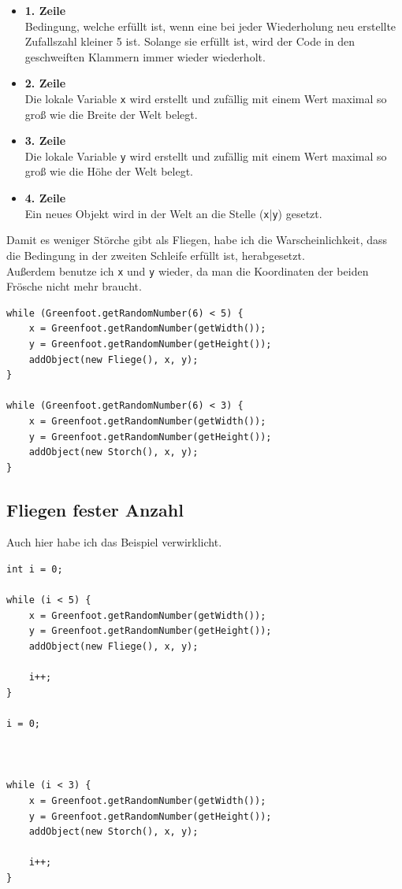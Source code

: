 \documentclass{scrartcl}   %
\begin{document}
\begin{itemize}
    \barrow
    \begin{itemize}
        \item \textbf{1. Zeile}\\
        Bedingung, welche erfüllt ist, wenn eine bei jeder Wiederholung neu erstellte Zufallszahl kleiner 5 ist. Solange sie erfüllt ist, wird der Code in den geschweiften Klammern immer wieder wiederholt.
        \item \textbf{2. Zeile}\\
        Die lokale Variable \texttt{x} wird erstellt und zufällig mit einem Wert maximal so groß wie die Breite der Welt belegt.
        \item \textbf{3. Zeile}\\
        Die lokale Variable \texttt{y} wird erstellt und zufällig mit einem Wert maximal so groß wie die Höhe der Welt belegt.
        \item \textbf{4. Zeile}\\
        Ein neues Objekt wird in der Welt an die Stelle (\texttt{x}|\texttt{y}) gesetzt.
    \end{itemize}
    \barrow Damit es weniger Störche gibt als Fliegen, habe ich die Warscheinlichkeit, dass die Bedingung in der zweiten Schleife erfüllt ist, herabgesetzt.\\
    Außerdem benutze ich \texttt{x} und \texttt{y} wieder, da man die Koordinaten der beiden Frösche nicht mehr braucht.\\
    \begin{lstlisting}
while (Greenfoot.getRandomNumber(6) < 5) {
    x = Greenfoot.getRandomNumber(getWidth());
    y = Greenfoot.getRandomNumber(getHeight());
    addObject(new Fliege(), x, y);
}
    
while (Greenfoot.getRandomNumber(6) < 3) {
    x = Greenfoot.getRandomNumber(getWidth());
    y = Greenfoot.getRandomNumber(getHeight());
    addObject(new Storch(), x, y);
}
    \end{lstlisting}
\end{itemize}

\subsection{Fliegen fester Anzahl}

Auch hier habe ich das Beispiel verwirklicht.\\
\begin{lstlisting}
int i = 0;
        
while (i < 5) {
    x = Greenfoot.getRandomNumber(getWidth());
    y = Greenfoot.getRandomNumber(getHeight());
    addObject(new Fliege(), x, y);
    
    i++;
}

i = 0;



while (i < 3) {
    x = Greenfoot.getRandomNumber(getWidth());
    y = Greenfoot.getRandomNumber(getHeight());
    addObject(new Storch(), x, y);
    
    i++;
}
\end{lstlisting}
\end{document}
